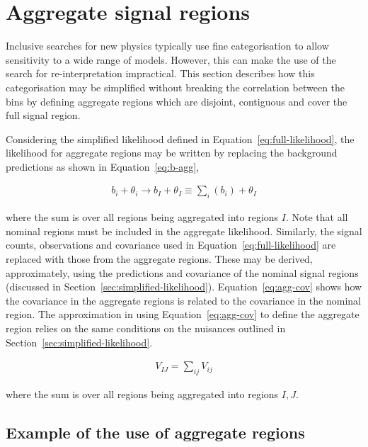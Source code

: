 \section{Aggregate signal regions}
\label{sec:aggregate-signal-regions}

Inclusive searches for new physics typically use fine categorisation to allow
sensitivity to a wide range of models. However, this can make the use
of the search for re-interpretation impractical. 
This section describes how this categorisation may be simplified without breaking the correlation 
between the bins by defining aggregate regions which are disjoint, 
contiguous and cover the full signal region.

Considering the simplified likelihood defined in Equation~\ref{eq:full-likelihood},
the likelihood for aggregate regions may be written by replacing the 
background predictions as shown in Equation~\ref{eq:b-agg},

\begin{align}
b_{i} + \theta_i \rightarrow b_I + \theta_I \equiv \sum_{i}(b_{i}) + \theta_I
\label{eq:b-agg}
\end{align}

where the sum is over all regions being aggregated into regions $I$.
Note that all nominal regions must be included in the aggregate likelihood.
Similarly, the signal counts, observations and covariance used in Equation~\ref{eq:full-likelihood} are
replaced with those from the aggregate regions. These may be derived, approximately, using the predictions and covariance
of the nominal signal regions (discussed in Section~\ref{sec:simplified-likelihood}).
Equation~\ref{eq:agg-cov} shows how the covariance in the aggregate
regions is related to the covariance in the nominal region. The approximation in using Equation~\ref{eq:agg-cov} to 
define the aggregate region relies on the same conditions 
on the nuisances outlined in Section~\ref{sec:simplified-likelihood}. 

\begin{align}
V_{IJ}=\sum_{ij}V_{ij}
\label{eq:agg-cov}
\end{align}

where the sum is over all regions being aggregated into regions $I,J$. 

\subsection{Example of the use of aggregate regions}
\label{sec:agg-toy}

